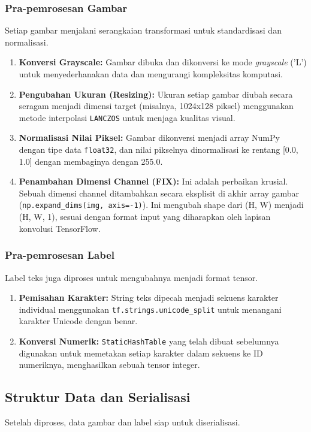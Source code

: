\documentclass{article}
\begin{document}
\subsubsection{Pra-pemrosesan Gambar}
Setiap gambar menjalani serangkaian transformasi untuk standardisasi dan normalisasi.
\begin{enumerate}
    \item \textbf{Konversi Grayscale:} Gambar dibuka dan dikonversi ke mode \textit{grayscale} ('L') untuk menyederhanakan data dan mengurangi kompleksitas komputasi.
    \item \textbf{Pengubahan Ukuran (Resizing):} Ukuran setiap gambar diubah secara seragam menjadi dimensi target (misalnya, 1024x128 piksel) menggunakan metode interpolasi \texttt{LANCZOS} untuk menjaga kualitas visual.
    \item \textbf{Normalisasi Nilai Piksel:} Gambar dikonversi menjadi array NumPy dengan tipe data \texttt{float32}, dan nilai pikselnya dinormalisasi ke rentang [0.0, 1.0] dengan membaginya dengan 255.0.
    \item \textbf{Penambahan Dimensi Channel (FIX):} Ini adalah perbaikan krusial. Sebuah dimensi channel ditambahkan secara eksplisit di akhir array gambar (\texttt{np.expand\_dims(img, axis=-1)}). Ini mengubah shape dari (H, W) menjadi (H, W, 1), sesuai dengan format input yang diharapkan oleh lapisan konvolusi TensorFlow.
\end{enumerate}

\subsubsection{Pra-pemrosesan Label}
Label teks juga diproses untuk mengubahnya menjadi format tensor.
\begin{enumerate}
    \item \textbf{Pemisahan Karakter:} String teks dipecah menjadi sekuens karakter individual menggunakan \texttt{tf.strings.unicode\_split} untuk menangani karakter Unicode dengan benar.
    \item \textbf{Konversi Numerik:} \texttt{StaticHashTable} yang telah dibuat sebelumnya digunakan untuk memetakan setiap karakter dalam sekuens ke ID numeriknya, menghasilkan sebuah tensor integer.
\end{enumerate}

\subsection{Struktur Data dan Serialisasi}
Setelah diproses, data gambar dan label siap untuk diserialisasi.
\end{document}
